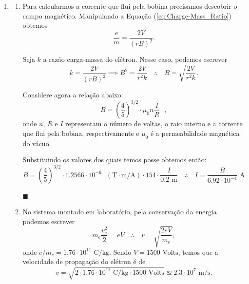 \documentclass[12pt,a4paper]{article}
\begin{document}
\begin{enumerate}
        \item  
        \begin{enumerate}
            \item Para calcularmos a corrente que flui pela bobina precisamos descobrir o campo magnético. Manipulando a Equação (\ref{eq:Charge-Mass_Ratio}) obtemos
        \begin{equation} \label{eq:e/m - 1st}
            \frac{e}{m}=\frac{2V}{\left(rB\right)^{2}}.
        \end{equation}
        
        Seja $k$ a razão carga-massa do elétron. Nesse caso, podemos escrever 
        \begin{equation} \label{eq:e/m - analítico}
            k=\frac{2V}{\left(rB\right)^{2}}\implies B^2=\frac{2V}{r^{2}k}\quad\therefore\quad B=\sqrt{\frac{2V}{r^{2}k}}.
        \end{equation}

        Considere agora a relação abaixo:
        \begin{equation} \label{eq:Relação para B}
             B=\left(\frac{4}{5}\right)^{3/2}\cdot\mu_0 n\frac{I}{R}\text{ },
        \end{equation}
        onde $n$, $R$ e $I$ representam o número de voltas, o raio interno e a corrente que flui pela bobina, respectivamente e $\mu_0$ é a permeabilidade magnética do vácuo.

        Substituindo os valores dos quais temos posse obtemos então:
        \begin{equation} \label{eq:conta}
            B=\left(\frac{4}{5}\right)^{3/2}\cdot1.2566\cdot10^{-6}\text{ }(\text{T}\cdot\text{m}/\text{A})\cdot154\cdot\frac{I}{0.2\text{ m}}\quad\therefore\quad\boxed{I=\frac{B}{6.92\cdot10^{-4}}\text{ A}}
        \end{equation}
        \begin{flushright}
            $\blacksquare$
        \end{flushright}



        \item No sistema montado em laboratório, pela conservação da energia podemos escrever
        \begin{equation} \label{eq:Fcp=eV}
            m_{e}\frac{v_{e}^{2}}{2}=eV\quad\therefore\quad v=\sqrt{\frac{2eV}{m_{e}}},
        \end{equation}
        onde $e/m_e=1.76\cdot10^{11}\text{ C/kg}$. Sendo $V=1500\text{ Volts}$, temos que a velocidade de propagação do elétron é de
        \begin{equation}
            v=\sqrt{2\cdot1.76\cdot10^{11}\text{ C/kg}\cdot1500\text{ Volts}}\approxeq2.3\cdot10^{7}\text{ m/s}.
        \end{equation}


\end{enumerate}
\end{enumerate}
\end{document}
